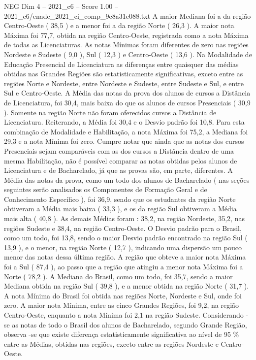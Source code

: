 \begin{textsample}{NEG Dim 4 – 2021\_c6 – Score 1.00 – 2021\_c6/enade\_2021\_ci\_comp\_9c8a31e088.txt}
A maior Mediana foi a da região Centro-Oeste ( 38,5 ) e a menor foi a da região Norte ( 26,3 ).
A maior nota Máxima foi 77,7, obtida na região Centro-Oeste, registrada como a nota Máxima de todas as Licenciaturas.
As notas Mínimas foram diferentes de zero nas regiões Nordeste e Sudeste ( 9,0 ), Sul ( 12,3 ) e Centro-Oeste ( 13,6 ).
Na Modalidade de Educação Presencial de Licenciatura as diferenças entre quaisquer das médias obtidas nas Grandes Regiões são estatisticamente significativas, exceto entre as regiões Norte e Nordeste, entre Nordeste e Sudeste, entre Sudeste e Sul, e entre Sul e Centro-Oeste.
A Média das notas da prova dos alunos de cursos a Distância de Licenciatura, foi 30,4, mais baixa do que os alunos de cursos Presenciais ( 30,9 ).
Somente na região Norte não foram oferecidos cursos a Distância de Licenciatura.
Reiterando, a Média foi 30,4 e o Desvio padrão foi 10,8.
Para esta combinação de Modalidade e Habilitação, a nota Máxima foi 75,2, a Mediana foi 29,3 e a nota Mínima foi zero.
Cumpre notar que ainda que as notas dos cursos Presenciais sejam comparáveis com as dos cursos a Distância dentro de uma mesma Habilitação, não é possível comparar as notas obtidas pelos alunos de Licenciatura e de Bacharelado, já que as provas são, em parte, diferentes.
A Média das notas da prova, como um todo dos alunos de Bacharelado ( nas seções seguintes serão analisados os Componentes de Formação Geral e de Conhecimento Específico ), foi 36,9, sendo que os estudantes da região Norte obtiveram a Média mais baixa ( 33,3 ), e os da região Sul obtiveram a Média mais alta ( 40,8 ).
As demais Médias foram : 38,2, na região Nordeste, 35,2, nas regiões Sudeste e 38,4, na região Centro-Oeste.
O Desvio padrão para o Brasil, como um todo, foi 13,8, sendo o maior Desvio padrão encontrado na região Sul ( 13,9 ), e o menor, na região Norte ( 12,7 ), indicando uma dispersão um pouco menor das notas dessa última região.
A região que obteve a maior nota Máxima foi a Sul ( 87,4 ), ao passo que a região que atingiu a menor nota Máxima foi a Norte ( 78,2 ).
A Mediana do Brasil, como um todo, foi 35,7, sendo a maior Mediana obtida na região Sul ( 39,8 ), e a menor obtida na região Norte ( 31,7 ).
A nota Mínima do Brasil foi obtida nas regiões Norte, Nordeste e Sul, onde foi zero.
A maior nota Mínima, entre as cinco Grandes Regiões, foi 9,2, na região Centro-Oeste, enquanto a nota Mínima foi 2,1 na região Sudeste.
Considerando -se as notas de todo o Brasil dos alunos de Bacharelado, segundo Grande Região, observa -se que existe diferença estatisticamente significativa ao nível de 95 \% entre as Médias, obtidas nas regiões, exceto entre as regiões Nordeste e Centro-Oeste.

\end{textsample}
